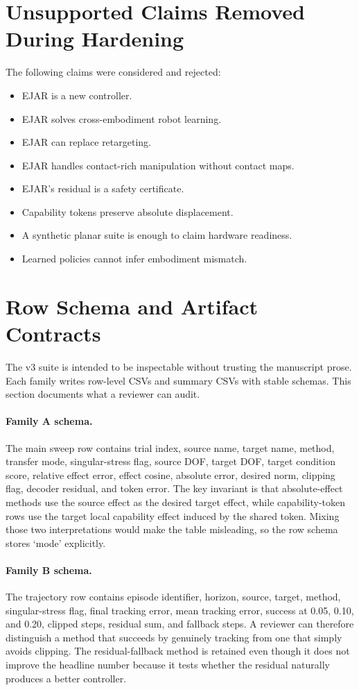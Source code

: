 \documentclass{article}
\begin{document}
\section{Unsupported Claims Removed During Hardening}

The following claims were considered and rejected:
\begin{itemize}
\item EJAR is a new controller.
\item EJAR solves cross-embodiment robot learning.
\item EJAR can replace retargeting.
\item EJAR handles contact-rich manipulation without contact maps.
\item EJAR's residual is a safety certificate.
\item Capability tokens preserve absolute displacement.
\item A synthetic planar suite is enough to claim hardware readiness.
\item Learned policies cannot infer embodiment mismatch.
\end{itemize}

\clearpage
\section{Row Schema and Artifact Contracts}

The v3 suite is intended to be inspectable without trusting the manuscript prose. Each family writes row-level CSVs and summary CSVs with stable schemas. This section documents what a reviewer can audit.

\paragraph{Family A schema.}
The main sweep row contains trial index, source name, target name, method, transfer mode, singular-stress flag, source DOF, target DOF, target condition score, relative effect error, effect cosine, absolute error, desired norm, clipping flag, decoder residual, and token error. The key invariant is that absolute-effect methods use the source effect as the desired target effect, while capability-token rows use the target local capability effect induced by the shared token. Mixing those two interpretations would make the table misleading, so the row schema stores `mode' explicitly.

\paragraph{Family B schema.}
The trajectory row contains episode identifier, horizon, source, target, method, singular-stress flag, final tracking error, mean tracking error, success at 0.05, 0.10, and 0.20, clipped steps, residual sum, and fallback steps. A reviewer can therefore distinguish a method that succeeds by genuinely tracking from one that simply avoids clipping. The residual-fallback method is retained even though it does not improve the headline number because it tests whether the residual naturally produces a better controller.
\end{document}
